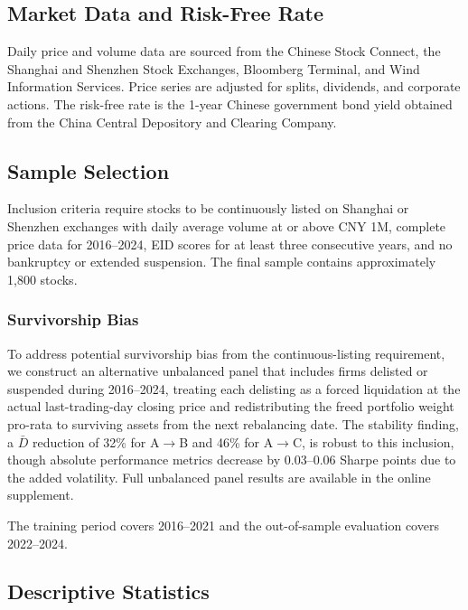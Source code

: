 \documentclass[12pt]{article}
\begin{document}
\subsection{Market Data and Risk-Free Rate}

Daily price and volume data are sourced from the Chinese Stock Connect, the Shanghai and Shenzhen Stock Exchanges, Bloomberg Terminal, and Wind Information Services. Price series are adjusted for splits, dividends, and corporate actions. The risk-free rate is the 1-year Chinese government bond yield obtained from the China Central Depository and Clearing Company.

\subsection{Sample Selection}

Inclusion criteria require stocks to be continuously listed on Shanghai
or Shenzhen exchanges with daily average volume at or above CNY 1M,
complete price data for 2016--2024, EID scores for at least three
consecutive years, and no bankruptcy or extended suspension. The final
sample contains approximately 1,800 stocks.

\subsubsection*{Survivorship Bias}
To address potential survivorship bias from the continuous-listing
requirement, we construct an alternative unbalanced panel that includes
firms delisted or suspended during 2016--2024, treating each delisting as a forced liquidation at the actual
last-trading-day closing price and redistributing the freed portfolio
weight pro-rata to surviving assets from the next rebalancing date.
The stability finding, a $\bar{D}$ reduction of 32\% for A$\to$B and
46\% for A$\to$C, is robust to this inclusion, though absolute
performance metrics decrease by 0.03--0.06 Sharpe points due to the
added volatility. Full unbalanced panel results are available in the
online supplement.

The training period covers 2016--2021 and the out-of-sample evaluation covers 2022--2024.

\subsection{Descriptive Statistics}
\end{document}
